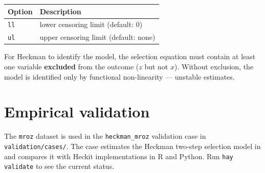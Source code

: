 \begin{center}
\begin{tabular}{ll}
\toprule
\textbf{Option} & \textbf{Description} \\
\midrule
\texttt{ll} & lower censoring limit (default: 0) \\
\texttt{ul} & upper censoring limit (default: none) \\
\bottomrule
\end{tabular}
\end{center}

\begin{aviso}
  For Heckman to identify the model, the selection equation must contain
  at least one variable \textbf{excluded} from the outcome ($z$ but not $x$).
  Without exclusion, the model is identified only by functional non-linearity —
  unstable estimates.
\end{aviso}

\section{Empirical validation}

The \texttt{mroz} dataset is used in the \texttt{heckman\_mroz} validation case
in \texttt{validation/cases/}. The case estimates the Heckman two-step
selection model in \hayashi{} and compares it with Heckit implementations in
R and Python. Run \lstinline{hay validate} to see the current status.
